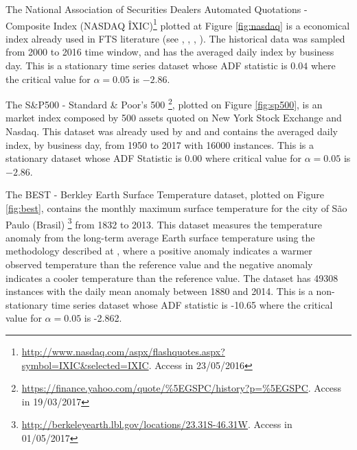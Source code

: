 The National Association of Securities Dealers Automated Quotations - Composite Index (NASDAQ \^IXIC)\footnote{\url{http://www.nasdaq.com/aspx/flashquotes.aspx?symbol=IXIC\&selected=IXIC}. Access in 23/05/2016} plotted at Figure \ref{fig:nasdaq} is a economical index already used in FTS literature (see \cite{Chen2011}, \cite{Sadaei2013}, \cite{Sadaei2014a}, \cite{Talarposhti2016a}). The historical data was sampled from 2000 to 2016 time window, and has the averaged daily index by business day. This is a stationary time series dataset whose ADF statistic is $0.04$ where the critical value for $\alpha = 0.05$ is $-2.86$.

The S\&P500 - Standard \& Poor's 500 \footnote{\url{https://finance.yahoo.com/quote/\%5EGSPC/history?p=\%5EGSPC}. Access in 19/03/2017}, plotted on Figure \ref{fig:sp500}, is an market index composed by 500 assets quoted on New York Stock Exchange and Nasdaq. This dataset was already used by \cite{Sadaei2014a} and \cite{Chen2015a} and contains the averaged daily index, by business day, from 1950 to 2017 with 16000 instances. This is a stationary dataset whose ADF Statistic is 0.00 where critical value for $\alpha = 0.05$ is $-2.86$.


The BEST - Berkley Earth Surface Temperature dataset, plotted on Figure \ref{fig:best}, contains the monthly maximum surface temperature for the city of São Paulo (Brasil) \footnote{\url{http://berkeleyearth.lbl.gov/locations/23.31S-46.31W}. Access in 01/05/2017} from 1832 to 2013. This dataset measures the temperature anomaly from the long-term average Earth surface temperature using the methodology described at \cite{Rohde2013}, where a positive anomaly indicates a warmer observed temperature than the reference value and the negative anomaly indicates a cooler temperature than the reference value. The dataset has 49308 instances with the daily mean anomaly between 1880 and 2014. This is a non-stationary time series dataset whose ADF statistic is -10.65 where the critical value for $\alpha=0.05$ is -2.862.

